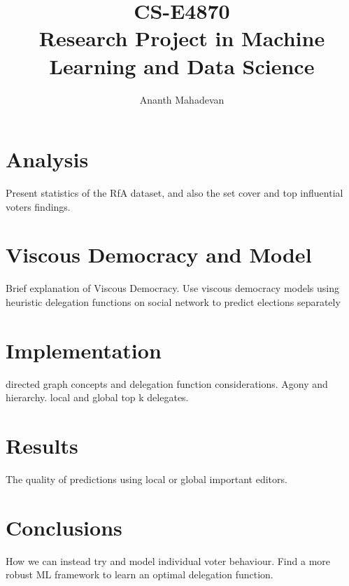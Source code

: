 \documentclass[twoside,leqno,twocolumn]{article}
\title{CS-E4870 \\
        \large Research Project in Machine Learning and Data Science}
\author{Ananth Mahadevan}
\affil{Department of Computer Science, Aalto University\\
\href{mailto:ananth.mahadevan@aalto.fi}{ananth.mahadevan@aalto.fi}}
\date{}
\begin{document}
\maketitle

\begin{abstract}
    \label{sec:abstract}
    
\end{abstract}










\section{Analysis}
Present statistics of the RfA dataset, and also the set cover and top influential voters findings.


\section{Viscous Democracy and Model}
\label{sec:model}
Brief explanation of Viscous Democracy.
Use viscous democracy models using heuristic delegation functions on social network to predict elections separately

\section{Implementation}
\label{sec:implementation}
directed graph concepts and delegation function considerations.
Agony and hierarchy. local and global top k delegates.

\section{Results}
The quality of predictions using local or global important editors.
\label{sec:results}

\section{Conclusions}
How we can instead try and model individual voter behaviour. Find a more robust ML framework to learn an optimal delegation function.
\label{sec:conclusion}





\end{document}
